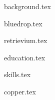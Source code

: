 \documentclass[11pt]{article}
\begin{document}
{background.tex}


{bluedrop.tex}

{retrievium.tex}



{education.tex}


{skills.tex}


{copper.tex}


\end{document}
